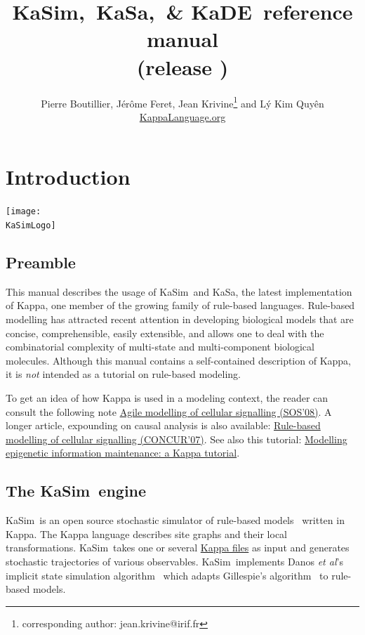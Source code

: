 \documentclass[11pt]{book}
\title{KaSim,~KaSa,~\& KaDE~reference manual\\ \small (release \version)}
\author{Pierre Boutillier, J\'er\^ome Feret, Jean Krivine\thanks{corresponding author: jean.krivine@irif.fr} and L\'y Kim Quy\^en \\\href{http://www.kappalanguage.org}{KappaLanguage.org}}
\date{}
\def\KaSimLogo{img/KaSim-Logo.pdf}
\def\KaSim{\textsf{KaSim}}
\def\KaSa{\textsf{KaSa}}
\begin{document}
\maketitle


\tableofcontents
\listoftables

\chapter{Introduction}
\begin{center}\texttt{[image: \\KaSimLogo]}\end{center}

\section{Preamble}
This manual describes the usage of \KaSim~and \KaSa, the latest implementation of Kappa, one member of the growing family of rule-based languages. Rule-based modelling has attracted recent attention in developing biological models that are concise, comprehensible, easily extensible, and allows one to deal with the combinatorial complexity of multi-state and multi-component biological molecules.
Although this manual contains a self-contained description of Kappa, it is \emph{not} intended as a tutorial on rule-based modeling.%
%

To get an idea of how Kappa is used in a modeling context, the reader can consult the following note \href{http://www.research.ed.ac.uk/portal/files/16869853/Agile_Modelling_of_Cellular_Signalling_Invited_Paper_.pdf}{Agile modelling of cellular signalling (SOS'08)}. A longer article, expounding on causal analysis is also available: \href{http://fontana.med.harvard.edu/www/Documents/WF/Papers/signaling.causality.pdf}{Rule-based modelling of cellular signalling (CONCUR'07)}. See also this tutorial: \href{https://hal.archives-ouvertes.fr/hal-00692430}{Modelling epigenetic information maintenance: a Kappa tutorial}.

\section{The \KaSim~engine}
\KaSim~is an open source stochastic simulator of rule-based models~\cite{DanLan04,Dan_etal07a,Fae_etal05} written in Kappa. The Kappa language describes site graphs and their local transformations. \KaSim~takes one or several \hyperref[chap:kappa]{Kappa files} as input and generates stochastic trajectories of various observables. \KaSim~implements Danos \textit{et al}'s implicit state simulation algorithm~\cite{Dan_etal07b} which adapts Gillespie's algorithm~\cite{Gil76,Gil77} to rule-based models.
\end{document}

